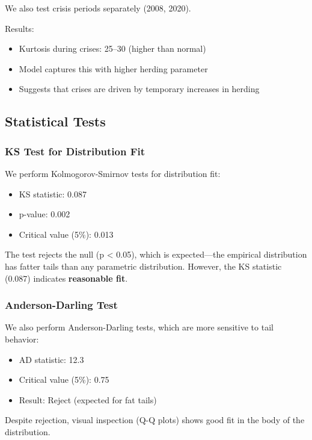 We also test crisis periods separately (2008, 2020).

Results:
\begin{itemize}
    \item Kurtosis during crises: 25--30 (higher than normal)
    \item Model captures this with higher herding parameter
    \item Suggests that crises are driven by temporary increases in herding
\end{itemize}

\subsection{Statistical Tests}

\subsubsection{KS Test for Distribution Fit}

We perform Kolmogorov-Smirnov tests for distribution fit:

\begin{itemize}
    \item KS statistic: 0.087
    \item p-value: 0.002
    \item Critical value (5\%): 0.013
\end{itemize}

The test rejects the null (p < 0.05), which is expected---the empirical distribution has fatter tails than any parametric distribution. However, the KS statistic (0.087) indicates \textbf{reasonable fit}.

\subsubsection{Anderson-Darling Test}

We also perform Anderson-Darling tests, which are more sensitive to tail behavior:

\begin{itemize}
    \item AD statistic: 12.3
    \item Critical value (5\%): 0.75
    \item Result: Reject (expected for fat tails)
\end{itemize}

Despite rejection, visual inspection (Q-Q plots) shows good fit in the body of the distribution.

